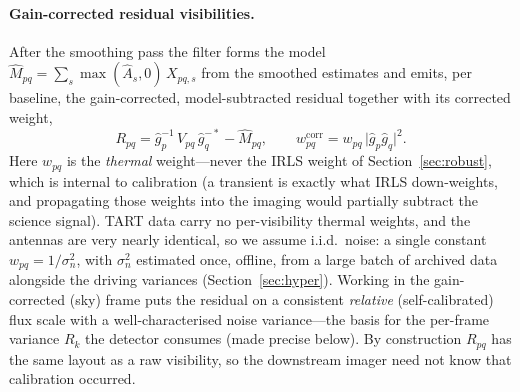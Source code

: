 \documentclass[11pt]{article}
\begin{document}
\paragraph{Gain-corrected residual visibilities.} After the smoothing pass the filter forms the model
$\hat M_{pq}=\sum_s\max(\hat A_s,0)\, X_{pq,s}$ from the smoothed estimates and emits, per baseline,
the gain-corrected, model-subtracted residual together with its corrected weight,
\begin{equation}
  R_{pq}=\hat g_p^{-1}\,V_{pq}\,\hat g_q^{-\ast}-\hat M_{pq},
  \qquad
  w^{\mathrm{corr}}_{pq}=w_{pq}\,\lvert \hat g_p\hat g_q\rvert^{2}.
  \label{eq:resid}
\end{equation}
Here $w_{pq}$ is the \emph{thermal} weight---never the IRLS weight of Section~\ref{sec:robust},
which is internal to calibration (a transient is exactly what IRLS down-weights, and propagating
those weights into the imaging would partially subtract the science signal). TART data carry no
per-visibility thermal weights, and the antennas are very nearly identical, so we assume i.i.d.\
noise: a single constant $w_{pq}=1/\sigma_n^2$, with $\sigma_n^2$ estimated once, offline, from a
large batch of archived data alongside the driving variances (Section~\ref{sec:hyper}). Working in
the gain-corrected (sky) frame puts the residual on a consistent \emph{relative}
(self-calibrated) flux scale with a well-characterised noise variance---the basis for the per-frame
variance $R_k$ the detector consumes (made precise below). By construction $R_{pq}$ has the same
layout as a raw visibility, so the downstream imager need not know that calibration occurred.
\end{document}
